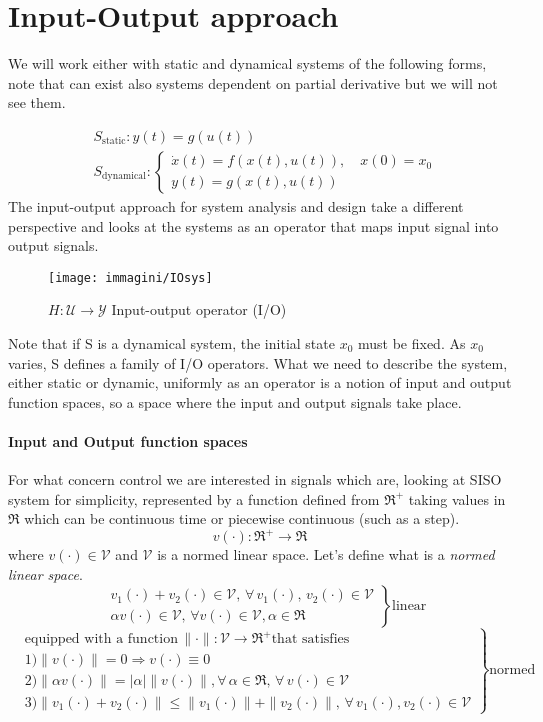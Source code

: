 \chapter{Input-Output approach}
We will work either with static and dynamical systems of the following forms, note that can exist also systems dependent on partial derivative but we will not see them.

\[
\begin{aligned}
&S_{\text{static}}: y(t)=g(u(t))\\
&S_{\text{dynamical}}: \begin{cases}
	\dot{x}(t)=f(x(t),u(t)), \quad x(0)=x_0\\
	y(t)=g(x(t),u(t))
\end{cases}
\end{aligned}
\]
The input-output approach for system analysis and design take a different perspective and looks at the systems as an operator that maps input signal into output signals.
\begin{figure}[H]
	\centering
	\texttt{[image: immagini/IOsys]}
	\caption{$H:\mathcal{U}\to \mathcal{Y}$ Input-output operator (I/O)}
	\label{fig:iosys}
\end{figure}
Note that if S is a dynamical system, the initial state $x_0$ must be fixed. As $x_0$ varies, S defines a family of I/O operators. What we need to describe the system, either static or dynamic, uniformly as an operator is a notion of input and output function spaces, so a space where the input and output signals take place.
\subsubsection{Input and Output function spaces}
 For what concern control we are interested in signals which are, looking at SISO system for simplicity, represented by a function defined from $\Re^+$ taking values in $\Re$ which can be continuous time or piecewise continuous (such as a step). \[v(\cdot):\Re^+\to\Re\] where $v(\cdot)\in\mathcal{V}$ and 
$\mathcal{V}$ is a normed linear space. Let's define what is a \emph{normed linear space}.
\[
\left.
\begin{aligned}
	&v_1(\cdot)+v_2(\cdot)\in\mathcal{V},\,\forall\,v_1(\cdot),\,v_2(\cdot)\in\mathcal{V}\\
	&\alpha v(\cdot)\in\mathcal{V},\,\forall v(\cdot)\in\mathcal{V},\alpha\in \Re
\end{aligned}
\right\rbrace \text{linear}
\]
\[
\left.
\begin{aligned}
	&\text{equipped with a function} \, \|\cdot\|:\mathcal{V}\to\Re^+\text{that satisfies}\\
	&1) \|v(\cdot)\| = 0 \Rightarrow v(\cdot)\equiv 0\\
	&2)\|\alpha v(\cdot)\|=|\alpha|\|v(\cdot)\|,\forall\,\alpha\in\Re,\,\forall\, v(\cdot)\in\mathcal{V}\\
	&3)\|v_1(\cdot)+v_2(\cdot)\|\le\|v_1(\cdot)\|+\|v_2(\cdot)\|,\,\forall\, v_1(\cdot),v_2(\cdot)\in\mathcal{V}
\end{aligned}
\right\rbrace\text{normed}
\]
